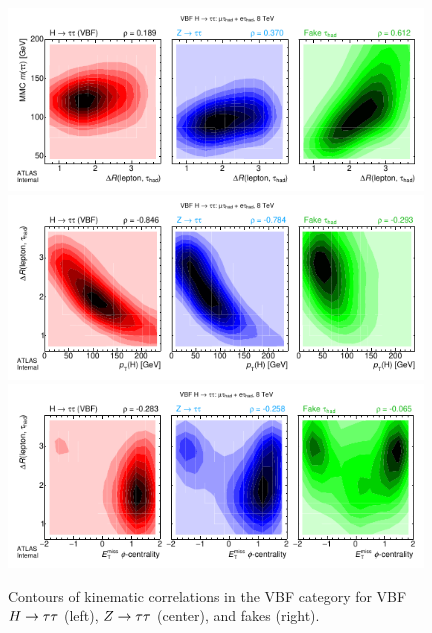 \clearpage
\begin{figure}[tp]
  \centering
  \includegraphics[width=0.98\textwidth]{figures/kinematiccorrelations/taulep_dR-vs-mMMC} \\
  \includegraphics[width=0.98\textwidth]{figures/kinematiccorrelations/H_pt-vs-taulep_dR} \\
  \includegraphics[width=0.98\textwidth]{figures/kinematiccorrelations/met_phi_cent-vs-taulep_dR} \\
  \caption{Contours of kinematic correlations in the VBF category for VBF $H\rightarrow\tau\tau$ (left), $Z\rightarrow\tau\tau$ (center), and fakes (right).}
  \label{fig:strategy-kinematic-correlations-1}
\end{figure}

